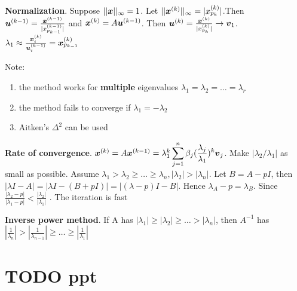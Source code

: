 \documentclass[11pt]{article}
\begin{document}
\textbf{Normalization}. Suppose \(||\boldsymbol{x}||_\infty=1\). Let
\(||\boldsymbol{x}^{(k)}||_\infty=|x_{p_k}^{(k)}|\).Then \(\boldsymbol{u}^{(k-1)}=
   \frac{\boldsymbol{x}^{(k-1)}}{|x_{p_{k-1}}^{(k-1)}|}\) and
\(\boldsymbol{x}^{(k)}=A\boldsymbol{u}^{(k-1)}\).
Then \(\boldsymbol{u}^{(k)}= \frac{\boldsymbol{x}^{(k)}}{|x_{p_k}^{(k)}|}\to \boldsymbol{v}_1\).
\(\lambda_1\approx
   \frac{\boldsymbol{x}_i^{(k)}}{\boldsymbol{u}_i^{(k-1)}}=\boldsymbol{x}_{p_{k-1}}^{(k)}\)

Note:
\begin{enumerate}
\item the method works for \textbf{multiple} eigenvalues
\(\lambda_1=\lambda_2=\dots=\lambda_r\)
\item the method fails to converge if \(\lambda_1=-\lambda_2\)
\item Aitken's \(\Delta^2\) can be used
\end{enumerate}


\textbf{Rate of convergence}. \(\boldsymbol{x}^{(k)}=A\boldsymbol{x}^{(k-1)}=\lambda_1^k
   \displaystyle\sum_{j=1}^n\beta_j(\frac{\lambda_j}{\lambda_1})^k\boldsymbol{v}_j\).
Make \(|\lambda_2/\lambda_1|\) as small as possible.
Assume \(\lambda_1>\lambda_2\ge\dots\ge\lambda_n, |\lambda_2|>|\lambda_n|\).
Let \(B=A-pI\), then \(|\lambda I-A|=|\lambda I-(B+pI)|=|(\lambda-p)I-B|\).
Hence \(\lambda_A-p=\lambda_B\). Since  \(\frac{|\lambda_2-p|}{|\lambda_1-p|}<
   \frac{|\lambda_2|}{|\lambda_1|}\) . The iteration is fast


\textbf{Inverse power method}. If A has
\(|\lambda_1|\ge|\lambda_2|\ge\dots>|\lambda_n|\), then \(A^{-1}\) has
\(|\frac{1}{\lambda_n}|>| \frac{1}{\lambda_{n-1}}|\ge\dots\ge|
   \frac{1}{\lambda_1}|\) 

\section{{\bfseries\sffamily TODO} ppt}
\label{sec:org3022bbe}
\end{document}
